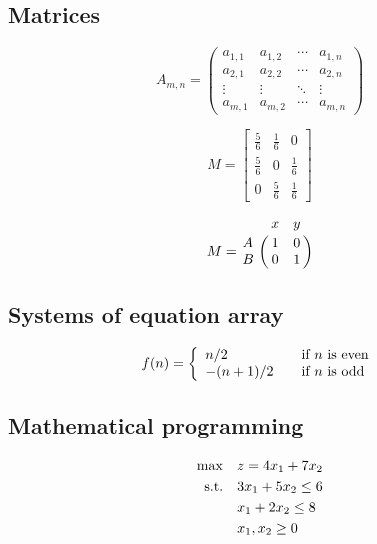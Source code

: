 \documentclass{article}
\begin{document}
\subsection{Matrices}\label{subsec:matrices}

$$
    A_{m,n} =
    \begin{pmatrix}
        a_{1,1} & a_{1,2} & \cdots & a_{1,n} \\
        a_{2,1} & a_{2,2} & \cdots & a_{2,n} \\
        \vdots  & \vdots  & \ddots & \vdots  \\
        a_{m,1} & a_{m,2} & \cdots & a_{m,n}
    \end{pmatrix}
$$

$$
    M =
    \begin{bmatrix}
        \frac{5}{6} & \frac{1}{6} & 0           \\[0.3em]
        \frac{5}{6} & 0           & \frac{1}{6} \\[0.3em]
        0           & \frac{5}{6} & \frac{1}{6}
    \end{bmatrix}
$$

$$
    M = \bordermatrix{~ & x & y \cr
                      A & 1 & 0 \cr
                      B & 0 & 1 \cr}
$$


\subsection{Systems of equation array}\label{subsec:syseq}

\[
    f(n) = \left\{
    \begin{array}{l l}
        n/2      & \quad \text{if $n$ is even}\\
        -(n+1)/2 & \quad \text{if $n$ is odd}
    \end{array} \right.
\]


\subsection{Mathematical programming}\label{subsec:mathprog}

\begin{align}
    \max        & \quad z = 4 x_1 + 7 x_2    \notag \\
    \text{s.t.} & \quad 3 x_1 + 5 x_2 \leq 6 \label{constraint1}\\
                & \quad   x_1 + 2 x_2 \leq 8 \label{constraint2}\\
                & \quad   x_1, x_2 \geq 0    \notag
\end{align}
\end{document}
